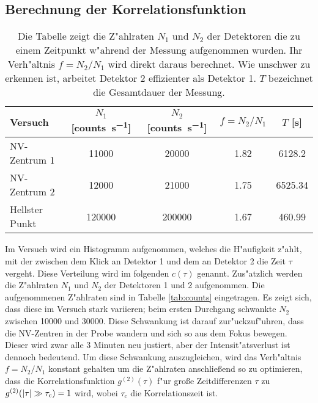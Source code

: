\subsection{Berechnung der Korrelationsfunktion}
\begin{table}[htbp]
    \caption{
        Die Tabelle zeigt die Z"ahlraten $N_1$ und $N_2$ der Detektoren die zu einem Zeitpunkt w"ahrend der Messung aufgenommen wurden.
        Ihr Verh"altnis $f=N_2/N_1$ wird direkt daraus berechnet.
        Wie unschwer zu erkennen ist, arbeitet Detektor 2 effizienter als Detektor 1.
        $T$ bezeichnet die Gesamtdauer der Messung.
        }
    \label{tab:counts}
    \begin{tabular}{l|S[table-format=6]S[table-format=6]S[table-format=1.2]S[table-format=4.2]}
        Versuch
            &{$N_1$ [\si{counts\per\second}]}
            &{$N_2$ [\si{counts\per\second}]}
            &{$f=N_2/N_1$}
            &{$T$ [\si{\second}]}\\\hline
        NV-Zentrum 1
            &11000
            &20000
            &1.82
            &6128.2\\
        NV-Zentrum 2
            &12000
            &21000
            &1.75
            &6525.34\\
        Hellster Punkt
            &120000
            &200000
            &1.67
            &460.99
    \end{tabular}
\end{table}
Im Versuch wird ein Histogramm aufgenommen, welches die H"aufigkeit z"ahlt, mit der zwischen dem Klick an Detektor 1 und dem an  Detektor 2 die Zeit $\tau$ vergeht.
Diese Verteilung wird im folgenden $c(\tau)$ genannt.
Zus"atzlich werden die Z"ahlraten $N_1$ und $N_2$ der Detektoren 1 und 2 aufgenommen.
Die aufgenommenen Z"ahlraten sind in Tabelle \vref{tab:counts} eingetragen.
Es zeigt sich, dass diese im Versuch stark variieren; beim ersten Durchgang schwankte $N_2$ zwischen \SI{10000}{} und \SI{30000}{}.
Diese Schwankung ist darauf zur"uckzuf"uhren, dass die NV-Zentren in der Probe wandern und sich so aus dem Fokus bewegen.
Dieser wird zwar alle 3 Minuten neu justiert, aber der Intensit"atsverlust ist dennoch bedeutend.
Um diese Schwankung auszugleichen, wird das Verh"altnis $f=N_2/N_1$ konstant gehalten um die Z"ahlraten anschlie\ss end so zu optimieren, dass die Korrelationsfunktion $g^{(2)}(\tau)$ f"ur gro\ss e Zeitdifferenzen $\tau$ zu $g^{(2)}(\abs{\tau}\gg \tau_\text{c})=1$ wird, wobei $\tau_\text{c}$ die Korrelationszeit ist.

